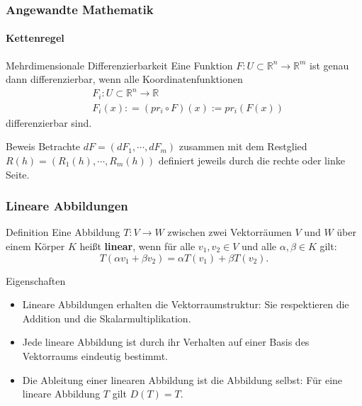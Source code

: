 \documentclass{beamer}
\begin{document}
     \begin{frame}
        \frametitle{Angewandte Mathematik}
    \framesubtitle{Kettenregel}
    
        \begin{block}{Mehrdimensionale Differenzierbarkeit}
    Eine Funktion $F: U \subset \mathbb{R}^n \to \mathbb{R}^m$ ist genau dann differenzierbar, wenn alle Koordinatenfunktionen
    \begin{align*}
    & F_i :U \subset \mathbb{R}^n \to \mathbb{R} \\
    & F_i(x): = (pr_i \circ F) (x) := pr_i(F(x))
    \end{align*}
    differenzierbar sind.
    \end{block}
        
    \begin{block}{Beweis}
        Betrachte $dF = (dF_1, \cdots, dF_m) $ zusammen mit dem  Restglied $R(h)  = (R_1(h), \cdots, R_m(h))$ definiert jeweils durch die rechte oder linke Seite.
        \end{block}
     \end{frame}
    
    
    

    

    \begin{frame}
        \frametitle{Lineare Abbildungen}
    
        \begin{block}{Definition}
            Eine Abbildung \( T: V \to W \) zwischen zwei Vektorräumen \( V \) und \( W \) über einem Körper \( K \) heißt \textbf{linear}, wenn für alle \( v_1, v_2 \in V \) und alle \( \alpha, \beta \in K \) gilt:
            \[
            T(\alpha v_1 + \beta v_2) = \alpha T(v_1) + \beta T(v_2).
            \]
        \end{block}
    
        \begin{block}{Eigenschaften}
            \begin{itemize}
                \item Lineare Abbildungen erhalten die Vektorraumstruktur: Sie respektieren die Addition und die Skalarmultiplikation.
                \item Jede lineare Abbildung ist durch ihr Verhalten auf einer Basis des Vektorraums eindeutig bestimmt.
                \item Die Ableitung einer linearen Abbildung ist die Abbildung selbst: Für eine lineare Abbildung \( T \) gilt \( D(T) = T \).
            \end{itemize}
        \end{block}
    
  
        
    \end{frame}
    
\end{document}
